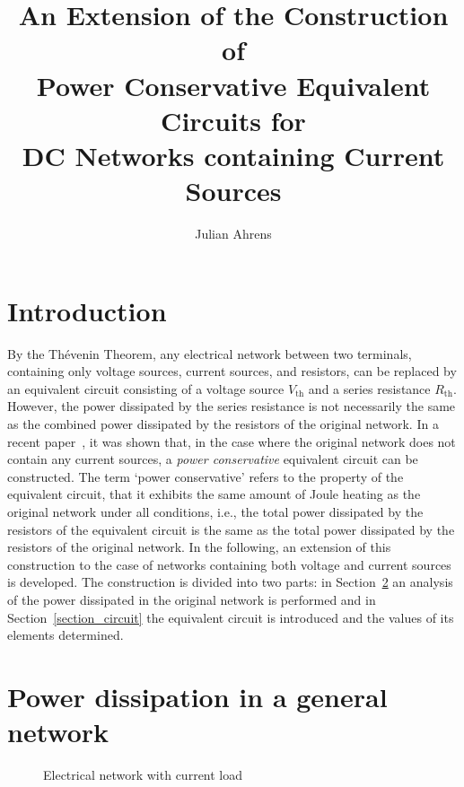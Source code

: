 \documentclass[twoside]{IEEEtran}
\newcommand{\opth}{{\operatorname{th}}}
\begin{document}
\title{An Extension of the Construction of\\Power Conservative Equivalent Circuits for\\DC Networks containing Current Sources}
\author{Julian Ahrens}
\maketitle

\section{Introduction}
\label{section_introduction}

By the Th\'{e}venin Theorem, any electrical network between two terminals, containing only voltage sources, current sources, and resistors, can be replaced by an equivalent circuit consisting of a voltage source $V_{\opth}$ and a series resistance $R_{\opth}$.
However, the power dissipated by the series resistance is not necessarily the same as the combined power dissipated by the resistors of the original network.
In a recent paper~\cite{Bar20}, it was shown that, in the case where the original network does not contain any current sources, a \emph{power conservative} equivalent circuit can be constructed.
The term `power conservative' refers to the property of the equivalent circuit, that it exhibits the same amount of Joule heating as the original network under all conditions, i.e., the total power dissipated by the resistors of the equivalent circuit is the same as the total power dissipated by the resistors of the original network.
In the following, an extension of this construction to the case of networks containing both voltage and current sources is developed.
The construction is divided into two parts: in Section~\ref{section_power} an analysis of the power dissipated in the original network is performed and in Section~\ref{section_circuit} the equivalent circuit is introduced and the values of its elements determined.

\section{Power dissipation in a general network}
\label{section_power}

\begin{figure}
  \centering
  
  \caption{Electrical network with current load}
  \label{loaded_network}
\end{figure}
\end{document}
